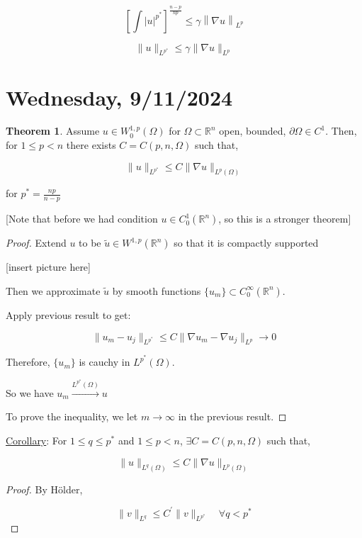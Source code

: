 \documentclass{article}
\theoremstyle{definition}
\newtheorem{theorem}{Theorem}
\begin{document}
\[
    \left[ \int \vert u \vert ^{p^{\ast}} \right] ^ { \frac{n-p}{np}} \leq \gamma  \left\lVert \nabla u \right\rVert _{L^p}
\]

\[
    \lVert u \rVert _{L^{p^{\ast}}} \leq \gamma \lVert \nabla u \rVert _{L^p}
\]

\section*{Wednesday, 9/11/2024}

\begin{theorem}
    Assume \(u \in W_0^{1,p}(\Omega)\) for \(\Omega \subset \mathbb{R}^n\) open, bounded, \(\partial \Omega \in C^1\). Then, for \(1 \leq p < n\) there exists \(C = C(p,n,\Omega)\) such that,
    
    \[
        \lVert u \rVert _{L^{p^{\ast}}} \leq C \lVert \nabla u \rVert _{L^p (\Omega)}
    \]

    for \(p^{\ast} = \frac{np}{n-p}\)

    [Note that before we had condition \(u\in C^1_0 (\mathbb{R}^n)\), so this is a stronger theorem]
\end{theorem}

\begin{proof}
    Extend \(u\) to be \(\tilde{u} \in W^{1,p} (\mathbb{R}^n)\) so that it is compactly supported

    [insert picture here]

    Then we approximate \(\tilde{u}\) by smooth functions \(\{ u_m \} \subset C_0^{\infty} (\mathbb{R}^n)\).

    Apply previous result to get:

    \[
        \lVert u_m - u_j \rVert _{L^{p^{\ast}}} \leq C \lVert \nabla u_m - \nabla u_j \rVert _{L^p} \to 0
    \]

    Therefore, \(\{ u_m \} \) is cauchy in \(L^{p^{\ast}}(\Omega)\).

    So we have \(u_m \overset{L^{p^{\ast}}(\Omega)}{\to} u\) 

    To prove the inequality, we let \(m\to \infty\) in the previous result.

\end{proof}

\underline{Corollary}: For \(1 \leq q \leq p^{\ast}\) and \(1 \leq p < n\), \(\exists C = C(p,n,\Omega)\) such that,

\[
    \lVert u \rVert _{L^q(\Omega)} \leq C \lVert \nabla u \rVert _{L^p(\Omega)}
\]

\begin{proof}
    By H\"older,

    \[
        \lVert v \rVert _{L^q} \leq C^{\prime} \lVert v \rVert _{L^{p^{\ast}}} \quad \forall q < p^{\ast}
    \]
\end{proof}
\end{document}
